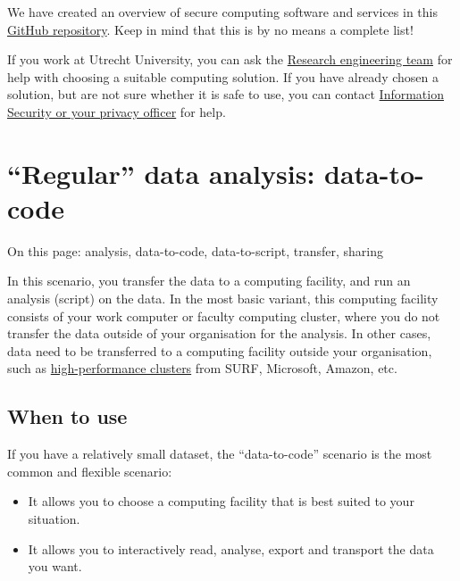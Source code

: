 \documentclass[
]{book}
\providecommand{\tightlist}{%
  \setlength{\itemsep}{0pt}\setlength{\parskip}{0pt}}
\begin{document}
We have created an overview of secure computing software and services in this
\href{https://github.com/UtrechtUniversity/privacy-engineering-tools/blob/main/secure-computing/secure-computing-tools.md}{GitHub repository}.
Keep in mind that this is by no means a complete list!

If you work at Utrecht University, you can ask the
\href{https://www.uu.nl/en/research/research-data-management/contact-us}{Research engineering team}
for help with choosing a suitable computing solution. If you have already
chosen a solution, but are not sure whether it is safe to use, you can contact
\protect\hyperlink{support}{Information Security or your privacy officer} for help.

\hypertarget{data-to-code}{%
\section{``Regular'' data analysis: data-to-code}\label{data-to-code}}

On this page: analysis, data-to-code, data-to-script, transfer, sharing

In this scenario, you transfer the data to a computing facility, and run an
analysis (script) on the data.
In the most basic variant, this computing facility consists of your work
computer or faculty computing cluster, where you do not transfer the data
outside of your organisation for the analysis. In other cases, data need to
be transferred to a computing facility outside your organisation, such as
\href{https://www.uu.nl/en/research/research-data-management/tools-services/software-and-computing/high-performance-and-cloud-computing}{high-performance clusters}
from SURF, Microsoft, Amazon, etc.

\hypertarget{when-to-use}{%
\subsection{When to use}\label{when-to-use}}

If you have a relatively small dataset, the ``data-to-code'' scenario is the most
common and flexible scenario:

\begin{itemize}
\tightlist
\item
  It allows you to choose a computing facility that is best suited to your
  situation.\\
\item
  It allows you to interactively read, analyse, export and transport the data
  you want.
\end{itemize}
\end{document}
